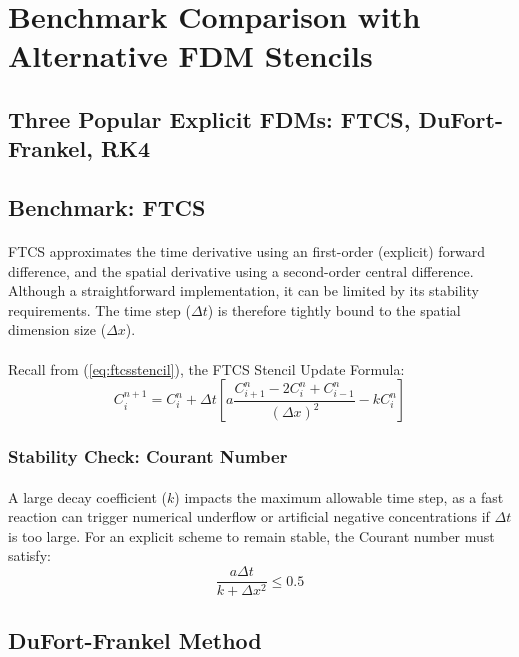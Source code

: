 \section{Benchmark Comparison with Alternative FDM Stencils}

\subsection*{Three Popular Explicit FDMs: FTCS, DuFort-Frankel, RK4}
\subsection*{Benchmark: FTCS}
\paragraph{}
FTCS approximates the time derivative using an first-order (explicit) forward difference, and the spatial derivative using a second-order central difference. Although a straightforward implementation, it can be limited by its stability requirements. The time step ($\Delta t$) is therefore tightly bound to the spatial dimension size ($\Delta x$).
\paragraph{}
Recall from (\ref{eq:ftcsstencil}), the FTCS Stencil Update Formula:
\begin{equation}
C_i^{n+1} = C_i^n + \Delta t \left[ a \frac{C_{i+1}^n - 2C_i^n + C_{i-1}^n}{(\Delta x)^2} - k C_i^n \right]
\end{equation}

\subsubsection*{Stability Check: Courant Number}
\paragraph{}
A large decay coefficient ($k$) impacts the maximum allowable time step, as a fast reaction can trigger numerical underflow or artificial negative concentrations if $\Delta t$ is too large. For an explicit scheme to remain stable, the Courant number must satisfy:
\begin{equation}
\label{eq:courantnumber}
\frac{a \Delta t}{k + \Delta x^2} \leq 0.5
\end{equation}

\subsection*{DuFort-Frankel Method}
